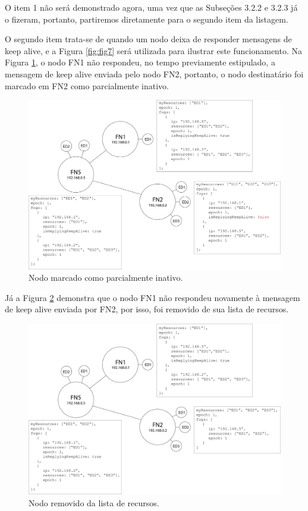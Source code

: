 O item 1 não será demonstrado agora, uma vez que as Subseções 3.2.2 e 3.2.3 já o fizeram, portanto, partiremos diretamente para o segundo item da listagem.

O segundo item trata-se de quando um nodo deixa de responder mensagens de keep alive, e a Figura \ref{fig:fig7} será utilizada para ilustrar este funcionamento.
Na Figura \ref{fig:fig8}, o nodo FN1 não respondeu, no tempo previamente estipulado, a mensagem de keep alive enviada pelo nodo FN2, 
portanto, o nodo destinatário foi marcado em FN2 como parcialmente inativo.


\begin{figure}[H]
    \centering\includegraphics[width=.8\textwidth]{fig8.png}
    \caption%
    {\label{fig:fig8} Nodo marcado como parcialmente inativo.}
\end{figure}

Já a Figura \ref{fig:fig9} demonstra que o nodo FN1 não respondeu novamente à mensagem de keep alive enviada por FN2, por isso, foi removido de sua lista de recursos. 

\begin{figure}[h!]
    \centering\includegraphics[width=.8\textwidth]{fig9.png}
    \caption%
    {\label{fig:fig9} Nodo removido da lista de recursos.}
\end{figure}

